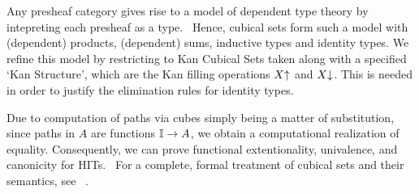 Any presheaf category gives rise to a model of dependent type theory by intepreting each presheaf as a type.~\cite{hofmann97} 
Hence, cubical sets form such a model with (dependent) products, (dependent) sums, inductive types and identity types.
We refine this model by restricting to Kan Cubical Sets taken along with a specified `Kan Structure',
which are the Kan filling operations $X \mathord{\uparrow}$ and $X \mathord{\downarrow}$. This is needed in order to justify the elimination rules for identity types.~\cite{bezem2014model}

Due to computation of paths via cubes simply being a matter of substitution, since paths in $A$ are functions $\mathbb{I} \to A$, we obtain a
computational realization of equality.
Consequently, we can prove functional extentionality, univalence, and canonicity for HITs.~\cite{bezem2019univalence, huber2019canonicity}
For a complete, formal treatment of cubical sets and their semantics, see ~\cite{huberphd, cohen2016cubical}.
